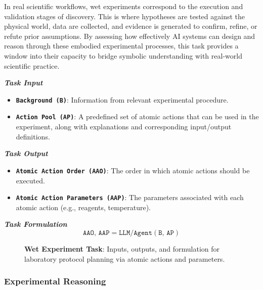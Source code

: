 In real scientific workflows, wet experiments correspond to the execution and validation stages of discovery. This is where hypotheses are tested against the physical world, data are collected, and evidence is generated to confirm, refine, or refute prior assumptions. By assessing how effectively AI systems can design and reason through these embodied experimental processes, this task provides a window into their capacity to bridge symbolic understanding with real-world scientific practice.

\begin{tcolorbox}[
    breakable,
    title=Task Definition of Wet Experiment,
    colback=LighterGray,
    colframe=DeepPurple,
    colbacktitle=DeepPurple,
    coltitle=White
]
\textbf{\emph{\textcolor{DeepPurple}{Task Input}}}
\begin{itemize}
    \item \texttt{\textbf{Background (B)}}: Information from relevant experimental procedure.
    \item \texttt{\textbf{Action Pool (AP)}}: A predefined set of atomic actions that can be used in the experiment, along with explanations and corresponding input/output definitions.
\end{itemize}

\textbf{\emph{\textcolor{DeepPurple}{Task Output}}}
\begin{itemize}
    \item \texttt{\textbf{Atomic Action Order (AAO)}}: The order in which atomic actions should be executed.
    \item \texttt{\textbf{Atomic Action Parameters (AAP)}}: The parameters associated with each atomic action (e.g., reagents, temperature).
\end{itemize}

\textbf{\emph{\textcolor{DeepPurple}{Task Formulation}}}
\[
\texttt{AAO, AAP}= \texttt{LLM/Agent}(\texttt{B, AP})
\]
\end{tcolorbox}

\begin{figure}[ht]
    \vspace{0.01cm}
    \caption{\textbf{Wet Experiment Task}: Inputs, outputs, and formulation for laboratory protocol planning via atomic actions and parameters.}
    \label{fig:Task Definition of Wet Experiment}
\end{figure}

\subsubsection{Experimental Reasoning}

